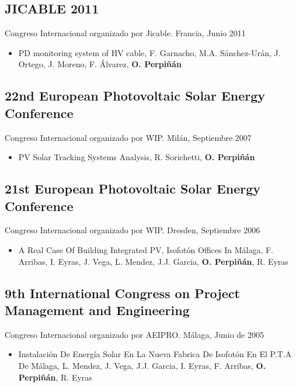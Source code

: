 \documentclass[article, a4paper]{memoir}
\begin{document}
\subsection{JICABLE 2011}
\label{sec-9-6}
Congreso Internacional organizado por Jicable. Francia, Junio 2011

\begin{itemize}
\item PD monitoring system of HV cable, F. Garnacho, M.A. Sánchez-Urán, J. Ortego, J. Moreno, F. Álvarez, \textbf{O. Perpiñán}
\end{itemize}

\subsection{22nd European Photovoltaic Solar Energy Conference}
\label{sec-9-7}
Congreso Internacional organizado por WIP. Milán, Septiembre 2007

\begin{itemize}
\item PV Solar Tracking Systems Analysis, R. Sorichetti, \textbf{O. Perpiñán}
\end{itemize}

\subsection{21st European Photovoltaic Solar Energy Conference}
\label{sec-9-8}
Congreso Internacional organizado por WIP. Dresden, Septiembre 2006

\begin{itemize}
\item A Real Case Of Building Integrated PV, Isofotón Offices In Málaga, F. Arribas, I. Eyras, J. Vega, L. Mendez, J.J. Garcia, \textbf{O. Perpiñán}, R. Eyras
\end{itemize}

\subsection{9th International Congress on  Project Management and Engineering}
\label{sec-9-9}
Congreso Internacional organizado por AEIPRO. Málaga, Junio de 2005

\begin{itemize}
\item Instalación De Energía Solar En La Nueva Fabrica De Isofotón En El P.T.A De Málaga, L. Mendez, J. Vega, J.J. Garcia, I. Eyras, F. Arribas, \textbf{O. Perpiñán}, R. Eyras
\end{itemize}
\end{document}
